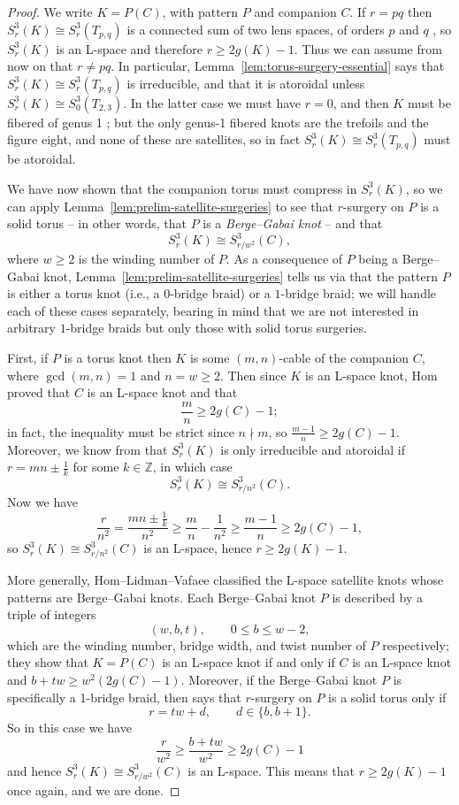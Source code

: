 \documentclass[11pt]{amsart}
\numberwithin{equation}{section}
\numberwithin{theorem}{section}
\theoremstyle{definition}
\newcommand{\Z}{\mathbb{Z}}
\begin{document}
\begin{proof}
We write $K = P(C)$, with pattern $P$ and companion $C$.  If $r=pq$ then $S^3_r(K) \cong S^3_r(T_{p,q})$ is a connected sum of two lens spaces, of orders $p$ and $q$ \cite{moser}, so $S^3_r(K)$ is an L-space and therefore $r \geq 2g(K)-1$.  Thus we can assume from now on that $r \neq pq$.  In particular, Lemma~\ref{lem:torus-surgery-essential} says that $S^3_r(K) \cong S^3_r(T_{p,q})$ is irreducible, and that it is atoroidal unless $S^3_r(K) \cong S^3_0(T_{2,3})$.  In the latter case we must have $r=0$, and then $K$ must be fibered of genus 1 \cite{gabai-foliations3}; but the only genus-1 fibered knots are the trefoils and the figure eight, and none of these are satellites, so in fact $S^3_r(K) \cong S^3_r(T_{p,q})$ must be atoroidal.

We have now shown that the companion torus must compress in $S^3_r(K)$, so we can apply Lemma~\ref{lem:prelim-satellite-surgeries} to see that $r$-surgery on $P$ is a solid torus -- in other words, that $P$ is a \emph{Berge--Gabai knot} -- and that
\[ S^3_r(K) \cong S^3_{r/w^2}(C), \]
where $w \geq 2$ is the winding number of $P$.  As a consequence of $P$ being a Berge--Gabai knot, Lemma~\ref{lem:prelim-satellite-surgeries} tells us via \cite{gabai-solid-tori} that the pattern $P$ is either a torus knot (i.e., a $0$-bridge braid) or a $1$-bridge braid; we will handle each of these cases separately, bearing in mind that we are not interested in arbitrary $1$-bridge braids but only those with solid torus surgeries.

First, if $P$ is a torus knot then $K$ is some $(m,n)$-cable of the companion $C$, where $\gcd(m,n)=1$ and $n = w \geq 2$.  Then since $K$ is an L-space knot, Hom \cite{hom-cabling} proved that $C$ is an L-space knot and that
\[ \frac{m}{n} \geq 2g(C) - 1; \]
in fact, the inequality must be strict since $n \nmid m$, so $\frac{m-1}{n} \geq 2g(C)-1$.  Moreover, we know from \cite[Corollary~7.3]{gordon} that $S^3_r(K)$ is only irreducible and atoroidal if $r=mn\pm\frac{1}{k}$ for some $k\in\Z$, in which case
\[ S^3_r(K) \cong S^3_{r/n^2}(C). \]
Now we have
\[ \frac{r}{n^2} = \frac{mn\pm\frac{1}{k}}{n^2} \geq \frac{m}{n} - \frac{1}{n^2} \geq \frac{m-1}{n} \geq 2g(C)-1, \]
so $S^3_r(K) \cong S^3_{r/n^2}(C)$ is an L-space, hence $r \geq 2g(K)-1$.

More generally, Hom--Lidman--Vafaee \cite[Theorem~1.3]{hom-lidman-vafaee} classified the L-space satellite knots whose patterns are Berge--Gabai knots.  Each Berge--Gabai knot $P$ is described by a triple of integers
\[ (w,b,t), \qquad 0 \leq b \leq w-2, \]
which are the winding number, bridge width, and twist number of $P$ respectively; they show that $K = P(C)$ is an L-space knot if and only if $C$ is an L-space knot and $b+tw \geq w^2(2g(C)-1)$.  Moreover, if the Berge--Gabai knot $P$ is specifically a 1-bridge braid, then \cite[Lemma~2.1]{hom-lidman-vafaee} says that $r$-surgery on $P$ is a solid torus only if
\[ r = tw+d, \qquad d \in \{b,b+1\}. \]
So in this case we have
\[ \frac{r}{w^2} \geq \frac{b+tw}{w^2} \geq 2g(C)-1 \]
and hence $S^3_r(K) \cong S^3_{r/w^2}(C)$ is an L-space.  This means that $r \geq 2g(K)-1$ once again, and we are done.
\end{proof}
\end{document}
